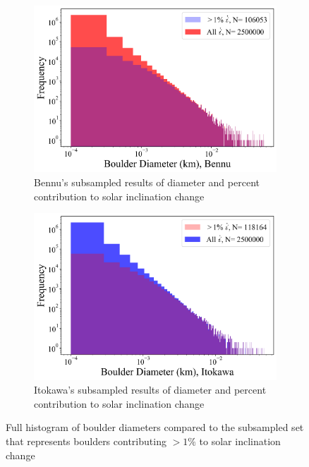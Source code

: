 \begin{figure}[H]
    \begin{subfigure}{0.49\textwidth}
        \centering
        \includegraphics[width=\textwidth]{fig/boulder_sizes_biggerthan1_bennu.png}
        \caption{Bennu's subsampled results of diameter and percent contribution to solar inclination change}
    \end{subfigure}
    \hfill
    \begin{subfigure}{0.49\textwidth}
        \centering
        \includegraphics[width=\textwidth]{fig/boulder_sizes_biggerthan1_itokawa.png}
        \caption{Itokawa's subsampled results of diameter and percent contribution to solar inclination change}
    \end{subfigure}  
    \caption{Full histogram of boulder diameters compared to the subsampled set that represents boulders contributing $> 1\%$ to solar inclination change}
    \label{fig:size_onepercent}
\end{figure}

